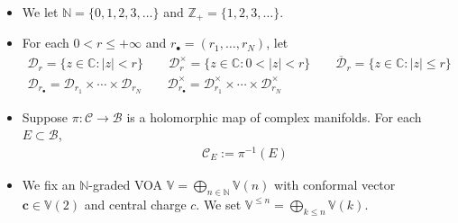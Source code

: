 \documentclass[11pt,b5paper,notitlepage]{article}
\theoremstyle{definition}
\theoremstyle{plain}
\newcommand{\mc}{\mathcal}
\newcommand{\ovl}{\overline}
\newcommand{\blt}{\bullet}
\newcommand{\Vbb}{\mathbb V}
\newcommand{\Cbb}{\mathbb C}
\newcommand{\Nbb}{\mathbb N}
\newcommand{\Zbb}{\mathbb Z}
\newcommand{\cbf}{\mathbf c}
\newcommand{\<}{\left\langle}
\renewcommand{\>}{\right\rangle}
\newcommand{\MC}{\mathcal{C}}
\newcommand{\MB}{\mathcal{B}}
\newcommand{\MD}{\mathcal{D}}
\numberwithin{equation}{section}
\begin{document}
\begin{itemize}
\item We let $\Nbb=\{0,1,2,3,\dots\}$ and $\Zbb_+=\{1,2,3,\dots\}$.
\item For each $0<r\leq+\infty$ and $r_\blt=(r_1,\dots,r_N)$, let
\begin{gather*}
\mc D_r=\{z\in\Cbb:|z|<r\}\qquad \mc D_r^\times=\{z\in\Cbb:0<|z|<r\}\qquad\ovl{\mc D}_r=\{z\in\Cbb:|z|\leq r\}\\
\MD_{r_\blt}=\MD_{r_1}\times\cdots\times\MD_{r_N}\qquad \MD^\times_{r_\blt}=\MD^\times_{r_1}\times\cdots\times\MD^\times_{r_N}
\end{gather*}


    \item Suppose $\pi:\MC\rightarrow \MB$ is a holomorphic map of complex manifolds. For each $E\subset\MB$, 
    \begin{align*}
 \quad \MC_E:=\pi^{-1}(E)
    \end{align*}


\item We fix an $\Nbb$-graded VOA $\Vbb=\bigoplus_{n\in\Nbb}\Vbb(n)$ with conformal vector $\cbf\in\Vbb(2)$  and central charge $c$. We set $\Vbb^{\leq n}=\bigoplus_{k\leq n}\Vbb(k)$. 


\end{itemize}
\end{document}
